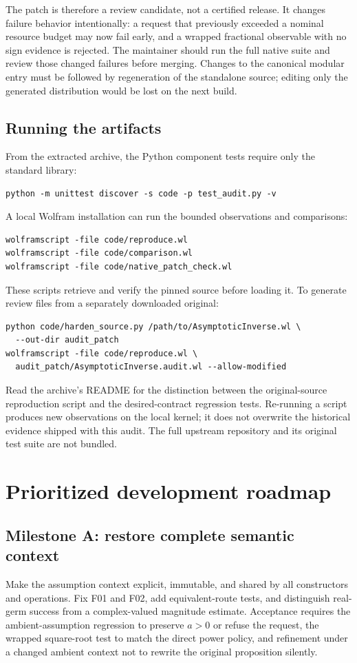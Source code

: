 \documentclass[11pt,a4paper]{article}
\begin{document}
The patch is therefore a review candidate, not a certified release. It changes failure behavior intentionally: a request that previously exceeded a nominal resource budget may now fail early, and a wrapped fractional observable with no sign evidence is rejected. The maintainer should run the full native suite and review those changed failures before merging. Changes to the canonical modular entry must be followed by regeneration of the standalone source; editing only the generated distribution would be lost on the next build.\cite{repo-development}

\subsection{Running the artifacts}
From the extracted archive, the Python component tests require only the standard library:
\begin{lstlisting}
python -m unittest discover -s code -p test_audit.py -v
\end{lstlisting}
A local Wolfram installation can run the bounded observations and comparisons:
\begin{lstlisting}
wolframscript -file code/reproduce.wl
wolframscript -file code/comparison.wl
wolframscript -file code/native_patch_check.wl
\end{lstlisting}
These scripts retrieve and verify the pinned source before loading it. To generate review files from a separately downloaded original:
\begin{lstlisting}
python code/harden_source.py /path/to/AsymptoticInverse.wl \
  --out-dir audit_patch
wolframscript -file code/reproduce.wl \
  audit_patch/AsymptoticInverse.audit.wl --allow-modified
\end{lstlisting}
Read the archive's README for the distinction between the original-source reproduction script and the desired-contract regression tests. Re-running a script produces new observations on the local kernel; it does not overwrite the historical evidence shipped with this audit. The full upstream repository and its original test suite are not bundled.

\section{Prioritized development roadmap}

\subsection{Milestone A: restore complete semantic context}
Make the assumption context explicit, immutable, and shared by all constructors and operations. Fix F01 and F02, add equivalent-route tests, and distinguish real-germ success from a complex-valued magnitude estimate. Acceptance requires the ambient-assumption regression to preserve \(a>0\) or refuse the request, the wrapped square-root test to match the direct power policy, and refinement under a changed ambient context not to rewrite the original proposition silently.
\end{document}
